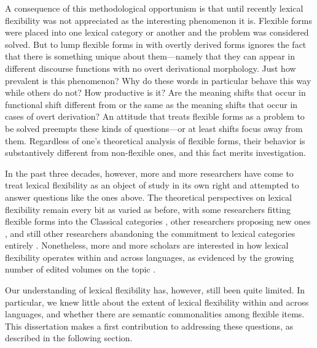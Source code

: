A consequence of this methodological opportunism is that until recently lexical flexibility was not appreciated as the interesting phenomenon it is. Flexible forms were placed into one lexical category or another and the problem was considered solved. But to lump flexible forms in with overtly derived forms ignores the fact that there is something unique about them—namely that they can appear in different discourse functions with no overt derivational morphology. Just how prevalent is this phenomenon? Why do these words in particular behave this way while others do not? How productive is it? Are the meaning shifts that occur in functional shift different from or the same as the meaning shifts that occur in cases of overt derivation? An attitude that treats flexible forms as a problem to be solved preempts these kinds of questions—or at least shifts focus away from them. Regardless of one's theoretical analysis of flexible forms, their behavior is substantively different from non-flexible ones, and this fact merits investigation.

In the past three decades, however, more and more researchers have come to treat lexical flexibility as an object of study in its own right and attempted to answer questions like the ones above. The theoretical perspectives on lexical flexibility remain every bit as varied as before, with some researchers fitting flexible forms into the Classical categories \parencites{Baker2003}{Dixon2004}{Floyd2011}{Chung2012}{Palmer2017}, other researchers proposing new ones \parencites{HengeveldRijkhoff2005}{Luuk2010}, and still other researchers abandoning the commitment to lexical categories entirely \parencites{Gil1994}{Broschart1997}{Gil2005}. Nonetheless, more and more scholars are interested in how lexical flexibility operates within and across languages, as evidenced by the growing number of edited volumes on the topic \parencites{VogelComrie2000}{LoisVapnarsky2003}{EvansOsada2005}{AnsaldoDonPfau2010}{RijkhoffLier2013}{SimoneMasini2014}{BlaszczakKlimekJankowskaMigdalski2015}{Lier2017}{VapnarskyVeneziano2017a}{VapnarskyVeneziano2017b}{CuyckensHeyvaertHartmann2019}.

Our understanding of lexical flexibility has, however, still been quite limited. In particular, we knew little about the extent of lexical flexibility within and across languages, and whether there are semantic commonalities among flexible items. This dissertation makes a first contribution to addressing these questions, as described in the following section.

